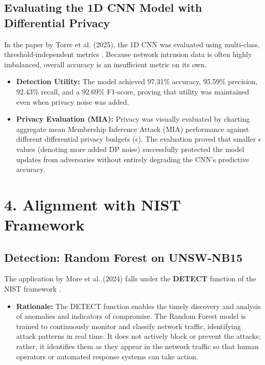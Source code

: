 \documentclass[letterpaper]{article}
\begin{document}
\subsection*{Evaluating the 1D CNN Model with Differential Privacy}
In the paper by Torre et al. (2025), the 1D CNN was evaluated using multi-class, threshold-independent metrics \cite{torre2025}. Because network intrusion data is often highly imbalanced, overall accuracy is an insufficient metric on its own.
\begin{itemize}
    \item \textbf{Detection Utility:} The model achieved 97.31\% accuracy, 95.59\% precision, 92.43\% recall, and a 92.69\% F1-score, proving that utility was maintained even when privacy noise was added.
    \item \textbf{Privacy Evaluation (MIA):} Privacy was visually evaluated by charting aggregate mean Membership Inference Attack (MIA) performance against different differential privacy budgets ($\epsilon$). The evaluation proved that smaller $\epsilon$ values (denoting more added DP noise) successfully protected the model updates from adversaries without entirely degrading the CNN's predictive accuracy.
\end{itemize}

\pagebreak

\section{4. Alignment with NIST Framework}

\subsection*{Detection: Random Forest on UNSW-NB15}
The application by More et al. (2024) falls under the \textbf{DETECT} function of the NIST framework \cite{nist_csf_2_0}. 
\begin{itemize}
    \item \textbf{Rationale:} The DETECT function enables the timely discovery and analysis of anomalies and indicators of compromise. The Random Forest model is trained to continuously monitor and classify network traffic, identifying attack patterns in real time. It does not actively block or prevent the attacks; rather, it identifies them as they appear in the network traffic so that human operators or automated response systems can take action.
\end{itemize}
\end{document}
